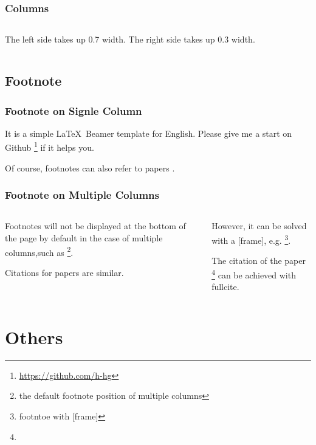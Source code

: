 \documentclass[
    10pt,
    pdf,
    UTF8,
    aspectratio=169
]{beamer}
\begin{document}
\begin{frame}
    \frametitle{Columns}
    \begin{columns}
        The left side takes up 0.7 width.
        The right side takes up 0.3 width.
    \end{columns}
\end{frame}

\subsection{Footnote}

\begin{frame}
    \frametitle{Footnote on Signle Column}
    \hspace{2em} It is a simple \LaTeX~Beamer template for English.
    Please give me a start on Github \footnote{
        \url{https://github.com/h-hg}
    } if it helps you.

    \hspace{2em} Of course, footnotes can also refer to papers .
\end{frame}

\begin{frame}
    \frametitle{Footnote on Multiple Columns}
    \begin{columns}
        \begin{column}{0.5\textwidth}
            \hspace{2em} Footnotes will not be displayed at the bottom of the page by default in the case of multiple columns,such as \footnote{the default footnote position of multiple columns}.

            \hspace{2em} Citations for papers  are similar.
        \end{column}
        \begin{column}{0.5\textwidth}
            \hspace{2em} However, it can be solved with a [frame], e.g. \footnote[frame]{footntoe with [frame]}.

            \hspace{2em} The citation of the paper \footnote[frame]{} can be achieved with fullcite.
        \end{column}
    \end{columns}
\end{frame}

\section{Others}
\end{document}
